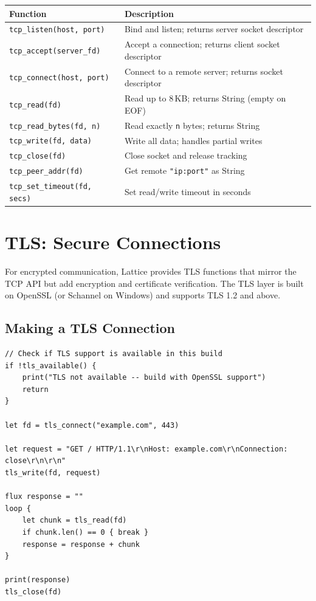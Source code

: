 \begin{center}
\begin{tabular}{lp{8cm}}
\toprule
\textbf{Function} & \textbf{Description} \\
\midrule
\lstinline|tcp_listen(host, port)| & Bind and listen; returns server socket descriptor \\
\lstinline|tcp_accept(server_fd)| & Accept a connection; returns client socket descriptor \\
\lstinline|tcp_connect(host, port)| & Connect to a remote server; returns socket descriptor \\
\lstinline|tcp_read(fd)| & Read up to 8\,KB; returns String (empty on EOF) \\
\lstinline|tcp_read_bytes(fd, n)| & Read exactly \texttt{n} bytes; returns String \\
\lstinline|tcp_write(fd, data)| & Write all data; handles partial writes \\
\lstinline|tcp_close(fd)| & Close socket and release tracking \\
\lstinline|tcp_peer_addr(fd)| & Get remote \texttt{"ip:port"} as String \\
\lstinline|tcp_set_timeout(fd, secs)| & Set read/write timeout in seconds \\
\bottomrule
\end{tabular}
\end{center}

\section{TLS: Secure Connections}\label{sec:tls}


For encrypted communication, Lattice provides TLS functions that mirror the
TCP API but add encryption and certificate verification. The TLS layer is
built on OpenSSL (or Schannel on Windows) and supports TLS 1.2 and above.

\subsection{Making a TLS Connection}

\begin{lstlisting}[language=Lattice, caption={Connecting with TLS}]
// Check if TLS support is available in this build
if !tls_available() {
    print("TLS not available -- build with OpenSSL support")
    return
}

let fd = tls_connect("example.com", 443)

let request = "GET / HTTP/1.1\r\nHost: example.com\r\nConnection: close\r\n\r\n"
tls_write(fd, request)

flux response = ""
loop {
    let chunk = tls_read(fd)
    if chunk.len() == 0 { break }
    response = response + chunk
}

print(response)
tls_close(fd)
\end{lstlisting}

